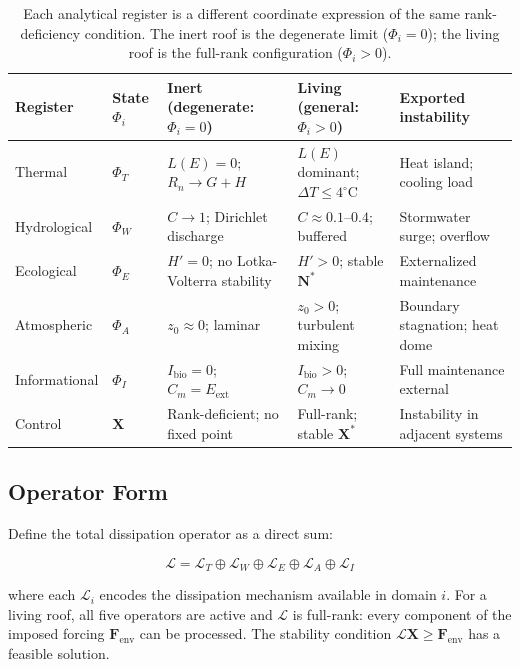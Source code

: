 \documentclass[12pt, a4paper]{article}
\theoremstyle{plain}
\theoremstyle{remark}
\begin{document}
\begin{table}[h!]
\centering
\caption{Each analytical register is a different coordinate expression of the same rank-deficiency condition. The inert roof is the degenerate limit ($\Phi_i = 0$); the living roof is the full-rank configuration ($\Phi_i > 0$).}
\label{tab:unified}
\renewcommand{\arraystretch}{1.55}
\begin{tabular}{p{1.7cm} p{1.3cm} p{2.9cm} p{2.9cm} p{3.2cm}}
\toprule
\textbf{Register} & \textbf{State $\Phi_i$} & \textbf{Inert (degenerate: $\Phi_i = 0$)} & \textbf{Living (general: $\Phi_i > 0$)} & \textbf{Exported instability} \\
\midrule
Thermal    & $\Phi_T$ & $L(E)=0$;\; $R_n \to G+H$       & $L(E)$ dominant;\; $\Delta T\leq 4^\circ$C & Heat island;\; cooling load \\
Hydrological & $\Phi_W$ & $C\to 1$;\; Dirichlet discharge  & $C\approx 0.1$--$0.4$;\; buffered         & Stormwater surge;\; overflow \\
Ecological  & $\Phi_E$ & $H'=0$;\; no Lotka-Volterra stability & $H'>0$;\; stable $\mathbf{N}^*$         & Externalized maintenance \\
Atmospheric & $\Phi_A$ & $z_0\approx 0$;\; laminar         & $z_0>0$;\; turbulent mixing               & Boundary stagnation;\; heat dome \\
Informational & $\Phi_I$ & $I_{\text{bio}}=0$;\; $C_m = E_{\text{ext}}$ & $I_{\text{bio}}>0$;\; $C_m\to 0$ & Full maintenance external \\
Control     & $\mathbf{X}$ & Rank-deficient;\; no fixed point & Full-rank;\; stable $\mathbf{X}^*$     & Instability in adjacent systems \\
\bottomrule
\end{tabular}
\end{table}

\subsection*{Operator Form}

Define the total dissipation operator as a direct sum:

\begin{equation}
\mathcal{L} = \mathcal{L}_T \oplus \mathcal{L}_W \oplus \mathcal{L}_E \oplus \mathcal{L}_A \oplus \mathcal{L}_I
\label{eq:operator}
\end{equation}

\noindent where each $\mathcal{L}_i$ encodes the dissipation mechanism available in domain $i$. For a living roof, all five operators are active and $\mathcal{L}$ is full-rank: every component of the imposed forcing $\mathbf{F}_{\text{env}}$ can be processed. The stability condition $\mathcal{L}\mathbf{X} \geq \mathbf{F}_{\text{env}}$ has a feasible solution.
\end{document}
